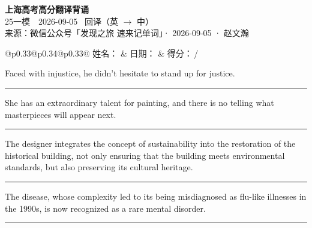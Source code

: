 \documentclass[11pt,a4paper]{article}
\newcommand{\num}[1]{\makebox[1.9em][r]{#1.}\hspace{0.3em}}
\newcommand{\wline}{\noindent\rule{\linewidth}{0.4pt}}
\begin{document}
\pagestyle{plain}
\begin{center}
{\LARGE\bfseries 上海高考高分翻译背诵 }\\[0.25em]
{\large 25一模　2026-09-05 \quad\ 回译（英 $\to$ 中）}\\[0.35em]
{\footnotesize 来源：微信公众号「发现之旅 速来记单词」· 2026-09-05 · 赵文瀚}
\end{center}

\vspace{0.4em}
\noindent\begin{tabular}{@{}p{0.33\textwidth}@{}p{0.34\textwidth}@{}p{0.33\textwidth}@{}}
姓名：\underline{\hspace{2.0cm}} & 日期：\underline{\hspace{2.0cm}} & 得分：\underline{\hspace{1.4cm}}\,/ \\
\end{tabular}

\vspace{0.5em}

\vspace{0.8em}
\num{1}Faced with injustice, he didn’t hesitate to stand up for justice.

\vspace{0.25em}

\wline

\num{2}She has an extraordinary talent for painting, and there is no telling what masterpieces will appear next.

\vspace{0.25em}

\wline

\num{3}The designer integrates the concept of sustainability into the restoration of the historical building, not only ensuring that the building meets environmental standards, but also preserving its cultural heritage.

\vspace{0.25em}

\wline

\num{4}The disease, whose complexity led to its being misdiagnosed as flu-like illnesses in the 1990s, is now recognized as a rare mental disorder.

\vspace{0.25em}

\wline
\end{document}
